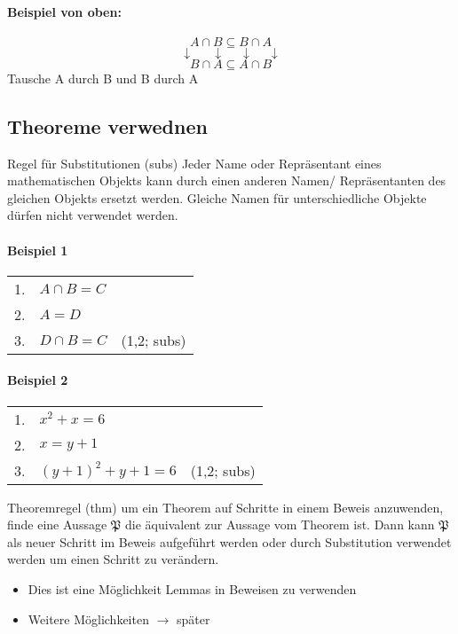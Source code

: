         \paragraph{Beispiel von oben:}
        \[
            A \cap B \subseteq B \cap A
        \]
        \[
            \downarrow \quad \ \ \downarrow \quad \ \downarrow \quad \ \downarrow    
        \]
        \[
            B \cap A \subseteq A \cap B
        \]
        Tausche A durch B und B durch A
    \subsection{Theoreme verwednen}
    {
        Regel für Substitutionen (subs)
    }
    {
        Jeder Name oder Repräsentant eines mathematischen Objekts kann durch einen anderen Namen/ Repräsentanten des gleichen Objekts ersetzt werden. Gleiche Namen für unterschiedliche Objekte dürfen nicht verwendet werden.
    }
    \paragraph{Beispiel 1}
        \begin{tabular}{p{0.8cm}p{6cm}p{4cm}}
            1. & \(A \cap B = C\) & \\
            2. & \(A = D\) & \\
            3. & \(D \cap B = C\) & (1,2; subs)\\
        \end{tabular}
        
    \paragraph{Beispiel 2}
        \begin{tabular}{p{0.8cm}p{6cm}p{4cm}}
            1. & \(x^2 + x = 6\) & \\
            2. & \(x = y + 1\) & \\
            3. & \((y+1)^2 + y + 1 = 6\) & (1,2; subs)\\
        \end{tabular}
    {
        Theoremregel (thm)
    }
    {
        um ein Theorem auf Schritte in einem Beweis anzuwenden, finde eine Aussage \(\mathfrak{P}\) die äquivalent zur Aussage vom Theorem ist. Dann kann \(\mathfrak{P}\) als neuer Schritt im Beweis aufgeführt werden oder durch Substitution verwendet werden um einen Schritt zu verändern.
    }
    \begin{itemize}
        \item Dies ist eine Möglichkeit Lemmas in Beweisen zu verwenden
        \item Weitere Möglichkeiten \(\rightarrow\) später
    \end{itemize}

